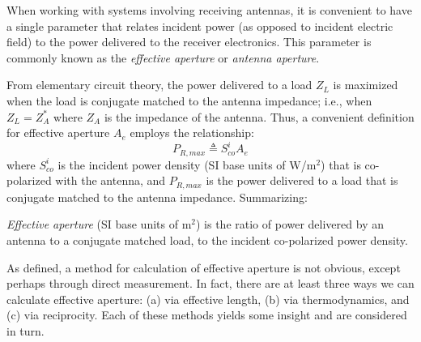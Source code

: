 

\label{m0218_Effective_Aperture} %

When working with systems involving receiving antennas, it is convenient to have a single parameter that relates incident power (as opposed to incident electric field) to the power delivered to the receiver electronics.
This parameter is commonly known as the \emph{effective aperture} or \emph{antenna aperture}. 

From elementary circuit theory, the power delivered to a load $Z_L$ is maximized when the load is conjugate matched to the antenna impedance; i.e.,  when $Z_L=Z_A^*$ where $Z_A$ is the impedance of the antenna.
Thus, a convenient definition for effective aperture $A_e$ employs the relationship:
%
\begin{equation}
P_{R,max} \triangleq S^i_{co} A_e
\label{m0218_eAedef}
\end{equation}
%
where 
$S^i_{co}$ is the incident power density (SI base units of W/m$^2$) that is co-polarized with the antenna, and
$P_{R,max}$ is the power delivered to a load that is conjugate matched to the antenna impedance. 
Summarizing:
%
\begin{mdframed}[backgroundcolor=yellow!20,nobreak=true] 
\emph{Effective aperture} (SI base units of m$^2$) is the ratio of power delivered by an antenna to a conjugate matched load, to the incident co-polarized power density.
\end{mdframed}

As defined, a method for calculation of effective aperture is not obvious, except perhaps through direct measurement.
In fact, there are at least three ways we can calculate effective aperture: (a) via effective length, (b) via thermodynamics, and (c) via reciprocity.
Each of these methods yields some insight and are considered in turn.

